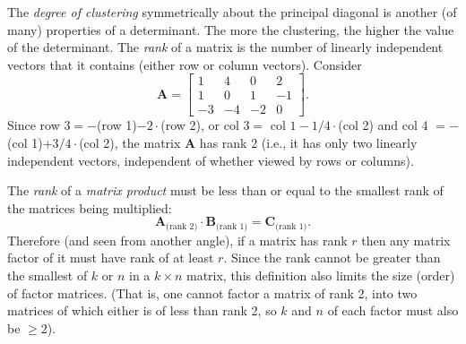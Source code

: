 The \emph{degree of clustering} symmetrically about the principal diagonal is another (of many) 
properties of a determinant. The more the clustering, the higher the value of the determinant.
The \emph{rank} of a matrix is the number of linearly 
independent vectors that it contains (either row or column vectors).  Consider
\begin{equation}
\mathbf{A} = \left [ \begin{array}{cccc}
1 & 4 & 0 & 2 \\1 & 0 & 1 & -1\\
-3 & -4 & -2 & 0
\end{array} \right] .
\end{equation}
Since row $3 = -$(row 1)$ - 2\cdot$(row 2), or col $3 = $ col $1 - 1/4\cdot$(col 2) and col 4 $= -$(col 1)$ + 3/4\cdot$(col 2), 
the matrix $\mathbf{A}$ has rank 2 (i.e., it has only two linearly independent vectors, independent of whether 
viewed by rows or columns).

The \emph{rank} of a \emph{matrix product} must be less than or equal to the 
smallest rank of the matrices being multiplied:
\begin{equation}
\mathbf{A}_{\mbox{(rank 2)}}\cdot \mathbf{B}_{\mbox{(rank 1)}} = \mathbf{C}_{\mbox{(rank 1)}}.
\end{equation}	 
Therefore (and seen from another angle), if a matrix has rank $r$ then any matrix factor of it must have 
rank of at least $r$. Since the rank cannot be greater than the smallest of $k$ or $n$ in a $k \times n$ matrix, 
this definition also limits the size (order) of factor matrices. (That is, one cannot factor a matrix 
of rank 2, into two matrices of which either is of less than rank 2, so $k$ and $n$ of each factor must 
also be $\geq 2$).


